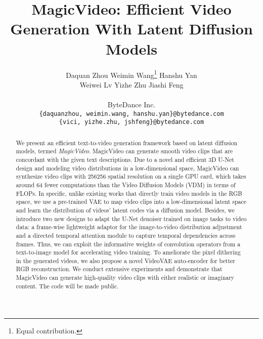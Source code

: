 \documentclass[10pt,twocolumn,letterpaper]{article}
\begin{document}
\title{ MagicVideo: Efficient Video Generation With Latent Diffusion Models}

\author{
  Daquan Zhou \quad Weimin Wang\thanks{Equal contribution.} \quad Hanshu Yan\\ \quad Weiwei Lv \quad Yizhe Zhu \quad Jiashi Feng \\
  \\
  ByteDance Inc. \\
  \texttt{\{{daquanzhou, weimin.wang, hanshu.yan\}@bytedance.com}} \\
  \texttt{\{{vici, yizhe.zhu, jshfeng\}@bytedance.com}} \\
  }

\maketitle
\ificcvfinal\thispagestyle{empty}\fi


\begin{abstract}
   We present an efficient text-to-video generation framework based on latent diffusion models, termed \emph{MagicVideo}. MagicVideo can generate smooth video clips that are concordant with the given text descriptions. Due to a novel and efficient 3D U-Net design and modeling video distributions in a low-dimensional space, MagicVideo can synthesize video clips with  256256 spatial resolution on a single GPU card, which takes around 64 fewer computations than the Video Diffusion Models (VDM) in terms of FLOPs. 
   In specific, unlike existing works that directly train video models in the RGB space, we use a pre-trained VAE to map video clips into a low-dimensional latent space and learn the distribution of videos' latent codes via a diffusion model. 
Besides, we introduce two new designs to adapt the U-Net denoiser trained on image tasks to video data: a frame-wise lightweight adaptor for the image-to-video distribution adjustment and a directed temporal attention module to capture temporal dependencies across frames. Thus, we can exploit the informative weights of convolution operators from a text-to-image model for accelerating video training.
   To ameliorate the pixel dithering in the generated videos, we also propose a novel VideoVAE auto-encoder for better RGB reconstruction. 
   We conduct extensive experiments and demonstrate that MagicVideo can generate high-quality video clips with either realistic or imaginary content. The code will be made public.
\end{abstract}
\end{document}
